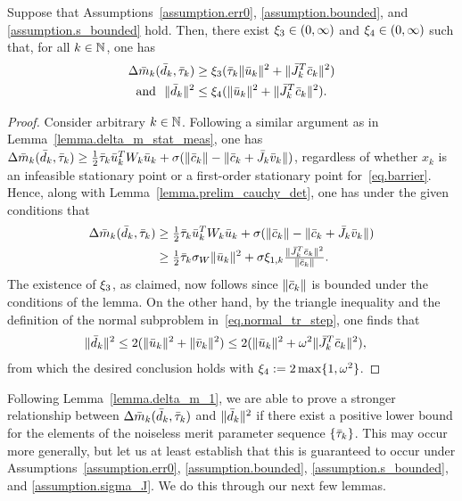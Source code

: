 \begin{lemma}\label{lemma.delta_m_1}
  Suppose that Assumptions~\ref{assumption.err0}, \ref{assumption.bounded}, and \ref{assumption.s_bounded} hold.  Then, there exist $\xi_3 \in (0, \infty)$ and $\xi_4 \in (0,\infty)$ such that, for all $k \in \mathbb{N}$, one has
  \begin{align*}
    \Delta \mtrue_k(\dtrue_k, \tautrue_k) &\geq \xithree (\tautrue_k \|\utrue_k\|^2 + \|\Jtrue_k^T \ctrue_k\|^2 ) \\ \text{and}\ \ 
    \|\dtrue_k\|^2 &\leq \xifour (\|\utrue_k\|^2 + \|\Jtrue_k^T \ctrue_k\|^2 ).
  \end{align*}
\end{lemma}
\begin{proof}
  Consider arbitrary $k \in \mathbb{N}$.  Following a similar argument as in Lemma~\ref{lemma.delta_m_stat_meas}, one has $\Delta {\bar m}_k({\bar d}_k, {\bar \tau}_k) \geq \tfrac12 {\bar \tau}_k {\bar u}_k^T W_k {\bar u}_k  + \sigma (\|{\bar c}_k\| - \|{\bar c}_k + {\bar J}_k {\bar v}_k\|)$, regardless of whether $x_k$ is an infeasible stationary point or a first-order stationary point for~\eqref{eq.barrier}.  Hence, along with Lemma~\ref{lemma.prelim_cauchy_det}, one has under the given conditions that
  \begin{align*}
    \Delta {\bar m}_k({\bar d}_k, {\bar \tau}_k) 
    &\geq \tfrac12 {\bar \tau}_k {\bar u}_k^T  W_k {\bar u}_k  + \sigma (\|{\bar c}_k\| - \|{\bar c}_k + {\bar J}_k {\bar v}_k\|) \\
    &\geq  \tfrac12 {\bar \tau}_k \sigma_W  \|{\bar u}_k\|^2 + \sigma \xi_{1, k} \tfrac{\|{\bar J}_k^T {\bar c}_k\|^2}{\|{\bar c}_k\|}.
  \end{align*}
  The existence of $\xi_3$, as claimed, now follows since $\|{\bar c}_k\|$ is bounded under the conditions of the lemma.  On the other hand, by the triangle inequality and the definition of the normal subproblem in~\eqref{eq.normal_tr_step}, one finds that
  \begin{align*}
    \|{\bar d}_k\|^2 & \leq  2 (\|{\bar u}_k\|^2 + \|{\bar v}_k\|^2)  \leq  2 (\|{\bar u}_k\|^2 + \omega^2 \|{\bar J}_k^T {\bar c}_k\|^2 ),
  \end{align*}
  from which the desired conclusion holds with $\xi_4 := 2 \max\{1, \omega^2\}$.
\end{proof}

Following Lemma~\ref{lemma.delta_m_1}, we are able to prove a stronger relationship between $\Delta {\bar m}_k({\bar d}_k, {\bar \tau}_k)$ and $\|{\bar d}_k\|^2$ if there exist a positive lower bound for the elements of the noiseless merit parameter sequence $\{{\bar \tau}_k\}$.  This may occur more generally, but let us at least establish that this is guaranteed to occur under Assumptions~\ref{assumption.err0}, \ref{assumption.bounded}, \ref{assumption.s_bounded}, and \ref{assumption.sigma_J}.  We do this through our next few lemmas.

